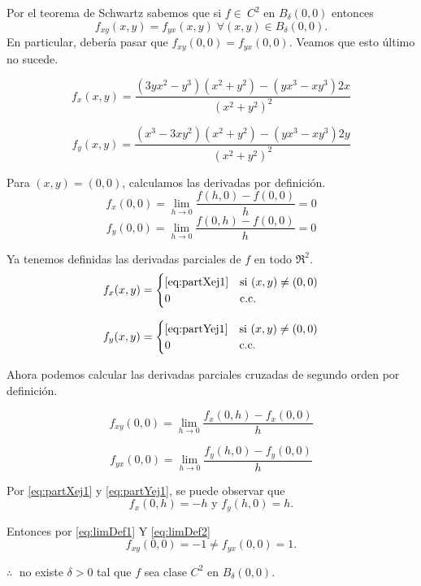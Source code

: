 \begin{solution}
Por el teorema de Schwartz sabemos que si $f \in\ C^2$ en  $B_{\delta}(0,0)$
entonces $$  f_{xy} (x,y) = f_{yx} (x,y) \; \forall (x,y) \in B_{\delta}(0,0).$$ En particular, deber\'ia pasar que $f_{xy} (0,0) = f_{yx}(0,0).$ Veamos que esto \'ultimo no sucede. 

\begin{equation}
 f_x(x,y) = \frac{(3yx^2-y^3)(x^2+y^2) - (yx^3-xy^3)2x}{(x^2+y^2)^2} \label{eq:partXej1}
\end{equation}

\begin{equation}
    f_y(x,y) = \frac{(x^3-3xy^2)(x^2+y^2) - (yx^3-xy^3)2y}{(x^2+y^2)^2}  \label{eq:partYej1}
\end{equation}

Para $(x,y) = (0,0)$, calculamos las derivadas por definición.
\[
f_x(0,0)  = \lim_{h\to0} \frac{f(h,0) - f(0,0)}{h} = 0
\]
\[
f_y(0,0)  =  \lim_{h\to0} \frac{f(0,h) - f(0,0)}{h} = 0
\]

Ya tenemos definidas las derivadas parciales de $f$ en todo $\Re^{2}.$
\[
f_x(x,y) =
        \begin{cases}
           \ref{eq:partXej1}   & \text{si}\ (x,y) \neq (0,0)\\
            0 & \text{c.c.}
        \end{cases}
\]

\[
f_y(x,y) =
        \begin{cases}
             \ref{eq:partYej1} & \text{si}\ (x,y) \neq (0,0)\\
            0 & \text{c.c.}
        \end{cases}
\]

Ahora podemos calcular las derivadas parciales cruzadas de segundo orden por definición.

\begin{equation}
f_{xy}(0,0) = \lim_{h\to0} \frac{f_x(0,h) - f_x(0,0)}{h} \label{eq:limDef1}
\end{equation}

\begin{equation}
f_{yx}(0,0) = \lim_{h\to0} \frac{f_y(h,0) - f_y(0,0)}{h}  \label{eq:limDef2}
\end{equation}

Por \eqref{eq:partXej1} y \eqref{eq:partYej1}, se puede observar que
\[
f_x(0,h) = -h \text{ y } f_y(h,0) = h.
\]

Entonces por \eqref{eq:limDef1} Y \eqref{eq:limDef2}
\[
f_{xy}(0,0) = -1 \neq f_{yx}(0,0) = 1.
\]

$\therefore\;$ no existe $\delta>0$ tal que $f$ sea clase $C^2$ en $B_{\delta}(0,0)$.
\end{solution}


